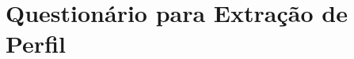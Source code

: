 \begin{anexosenv}
\label{anexo:questionario}
\partanexos

\chapter{Questionário para Extração de Perfil}



\end{anexosenv}

